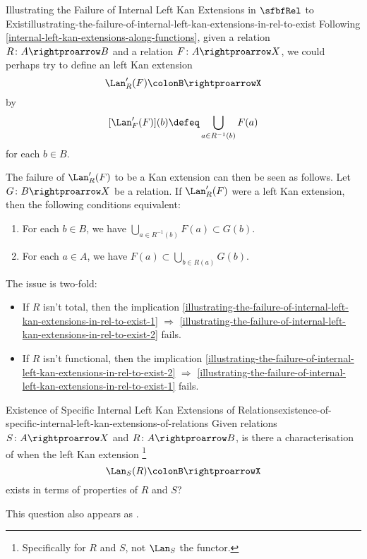 \begin{remark}{Illustrating the Failure of Internal Left Kan Extensions in $\sfbfRel$ to Exist}{illustrating-the-failure-of-internal-left-kan-extensions-in-rel-to-exist}%
    Following \cref{internal-left-kan-extensions-along-functions}, given a relation $R\colon A\rightproarrow B$ and a relation $F\colon A\rightproarrow X$, we could perhaps try to define an  left Kan extension
    \[
        \Lan'_{R}(F)%
        \colon%
        B%
        \rightproarrow%
        X%
    \]%
    by
    \[
        [\Lan'_{F}(F)](b)%
        \defeq%
        \bigcup_{a\in R^{-1}(b)}F(a)%
    \]%
    for each $b\in B$.

    \indent The failure of $\Lan'_{R}(F)$ to be a Kan extension can then be seen as follows. Let $G\colon B\rightproarrow X$ be a relation. If $\Lan'_{R}(F)$ were a left Kan extension, then the following conditions  equivalent:
    \begin{enumerate}
        \item\label{illustrating-the-failure-of-internal-left-kan-extensions-in-rel-to-exist-1}For each $b\in B$, we have $\bigcup_{a\in R^{-1}(b)}F(a)\subset G(b)$.
        \item\label{illustrating-the-failure-of-internal-left-kan-extensions-in-rel-to-exist-2}For each $a\in A$, we have $F(a)\subset\bigcup_{b\in R(a)}G(b)$.
    \end{enumerate}
    The issue is two-fold:
    \begin{itemize}
        \item{}If $R$ isn't total, then the implication \cref{illustrating-the-failure-of-internal-left-kan-extensions-in-rel-to-exist-1} $\Rightarrow$ \cref{illustrating-the-failure-of-internal-left-kan-extensions-in-rel-to-exist-2} fails.
        \item{}If $R$ isn't functional, then the implication \cref{illustrating-the-failure-of-internal-left-kan-extensions-in-rel-to-exist-2} $\Rightarrow$ \cref{illustrating-the-failure-of-internal-left-kan-extensions-in-rel-to-exist-1} fails.
    \end{itemize}
\end{remark}
\begin{question}{Existence of Specific Internal Left Kan Extensions of Relations}{existence-of-specific-internal-left-kan-extensions-of-relations}%
    Given relations $S\colon A\rightproarrow X$ and $R\colon A\rightproarrow B$, is there a characterisation of when the left Kan extension%
    \footnote{%
        Specifically for $R$ and $S$, not $\Lan_{S}$ the functor.
        \par\vspace*{\TCBBoxCorrection}
    }%
    \[
        \Lan_{S}(R)%
        \colon%
        B%
        \rightproarrow%
        X%
    \]%
    exists in terms of properties of $R$ and $S$?

    This question also appears as \cite{MO461592}.
\end{question}
